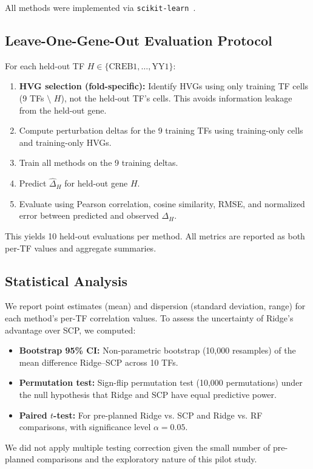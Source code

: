 \documentclass[12pt,number,sort&compress]{elsarticle}
\begin{document}
All methods were implemented via \texttt{scikit-learn}~\citep{Pedregosa2011sklearn}.

\subsection{Leave-One-Gene-Out Evaluation Protocol}
\label{sec:logo_protocol}

For each held-out TF $H \in \{\text{CREB1}, \ldots, \text{YY1}\}$:
\begin{enumerate}
  \setlength{\itemsep}{0pt}
  \setlength{\parsep}{0pt}
  \item \textbf{HVG selection (fold-specific):} Identify HVGs using only
        training TF cells (9 TFs $\setminus$ $H$), not the held-out TF's cells.
        This avoids information leakage from the held-out gene.
  \item Compute perturbation deltas for the 9 training TFs using training-only
        cells and training-only HVGs.
  \item Train all methods on the 9 training deltas.
  \item Predict $\hat{\Delta}_H$ for held-out gene $H$.
  \item Evaluate using Pearson correlation, cosine similarity, RMSE, and
        normalized error between predicted and observed $\Delta_H$.
\end{enumerate}

This yields 10 held-out evaluations per method. All metrics are reported
as both per-TF values and aggregate summaries.

\subsection{Statistical Analysis}
\label{sec:stats}

We report point estimates (mean) and dispersion (standard deviation, range)
for each method's per-TF correlation values. To assess the uncertainty of
Ridge's advantage over SCP, we computed:
\begin{itemize}
  \item \textbf{Bootstrap 95\% CI:} Non-parametric bootstrap (10,000 resamples)
        of the mean difference Ridge--SCP across 10 TFs.
  \item \textbf{Permutation test:} Sign-flip permutation test (10,000 permutations)
        under the null hypothesis that Ridge and SCP have equal predictive power.
  \item \textbf{Paired $t$-test:} For pre-planned Ridge vs. SCP and Ridge vs. RF
        comparisons, with significance level $\alpha = 0.05$.
\end{itemize}
We did not apply multiple testing correction given the small number of
pre-planned comparisons and the exploratory nature of this pilot study.
\end{document}
